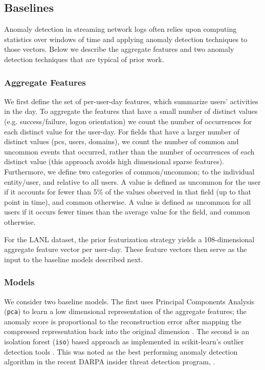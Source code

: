 \documentclass[letterpaper]{article} %
\begin{document}
\subsection{Baselines} \label{subsec:baselines}
Anomaly detection in streaming network logs often relies upon computing statistics over windows of time
and applying anomaly detection techniques to those vectors.
Below we describe the aggregate features and two anomaly detection techniques that are typical of prior work.

\subsubsection{Aggregate Features}
We first define the set of per-user-day features, which summarize users' activities in the day.
To aggregate the features that have a small number of distinct values (e.g. success/failure, logon orientation)
we count the number of occurrences for each distinct value for the user-day.
For fields that have a larger number of distinct values (pcs, users, domains), we count the number of common and uncommon events that occurred, rather than the number of occurrences of each distinct value (this approach avoids high dimensional sparse features).
Furthermore, we define two categories of common/uncommon; to the individual entity/user, and relative to all users.
A value is defined as uncommon for the user if it accounts for fewer than 5\% of the values observed in that field (up to that point in time), and common otherwise. A value is defined as uncommon for all users if it occurs fewer times than the average value for the field, and common otherwise.

For the LANL dataset, the prior featurization strategy yields a 108-dimensional aggregate feature vector per user-day.
These feature vectors then serve as the input to the baseline models described next.

\subsubsection{Models}
We consider two baseline models.
The first uses Principal Components Analysis (\verb|pca|) to learn a low dimensional representation of the aggregate features;
the anomaly score is proportional to the reconstruction error after mapping the compressed representation back into the original dimension \cite{ShyuChenetal03}.
The second is an isolation forest (\verb|iso|) based approach \cite{LiuTingZhou08}  as implemented in scikit-learn's outlier detection tools \cite{scikit-learn}. This was noted as the best performing anomaly detection algorithm in the recent DARPA insider threat detection program, \cite{gavai2015supervised}.
\end{document}
